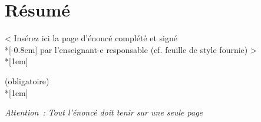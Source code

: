 \thispagestyle{noheader}
\chapter*{Résumé} %
\thispagestyle{noheader}

\vspace{118pt}

\begin{center}
	{\Large < Insérez ici la page d’énoncé complété et signé\\*[-0.8em]
		par l’enseignant-e responsable (cf. feuille de style fournie) >\\*[1em]
		
		(obligatoire)\\*[1em]
	
	\textit{Attention : Tout l’énoncé doit tenir sur une seule page}}
\end{center}